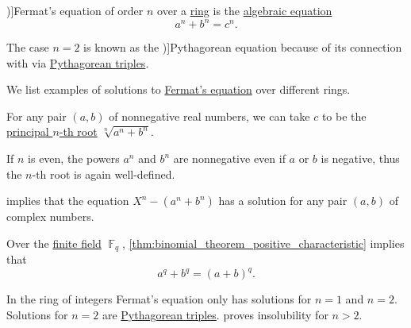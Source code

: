 \begin{definition}\label{def:fermats_equation}
  \term[ru=уравнение Ферма (\cite[314]{Бухштаб1966ТеорияЧисел})]{Fermat's equation} of order \( n \) over a \hyperref[def:ring]{ring} is the \hyperref[def:algebraic_equation]{algebraic equation}
  \begin{equation}\label{eq:def:fermats_equation}
    a^n + b^n = c^n.
  \end{equation}

  The case \( n = 2 \) is known as the \term[en=Pythagorean equation (\cite[\S 4.3.1]{Deza2012FigurateNumbers})]{Pythagorean equation} because of its connection with  via \hyperref[def:pythagorean_triple]{Pythagorean triples}.
\end{definition}

\begin{example}\label{ex:def:fermats_equation}
  We list examples of solutions to \hyperref[def:fermats_equation]{Fermat's equation} over different rings.
  \begin{thmenum}
     For any pair \( (a, b) \) of nonnegative real numbers, we can take \( c \) to be the \hyperref[def:principal_nonnegative_nth_root]{principal \( n \)-th root} \( \sqrt[n]{ a^n + b^n } \).

    If \( n \) is even, the powers \( a^n \) and \( b^n \) are nonnegative even if \( a \) or \( b \) is negative, thus the \( n \)-th root is again well-defined.

      implies that the equation \( X^n - (a^n + b^n) \) has a solution for any pair \( (a, b) \) of complex numbers.

     Over the \hyperref[def:finite_field]{finite field} \( \BbbF_q \), \cref{thm:binomial_theorem_positive_characteristic} implies that
    \begin{equation*}
      a^q + b^q = (a + b)^q.
    \end{equation*}

     In the ring of integers Fermat's equation only has solutions for \( n = 1 \) and \( n = 2 \). Solutions for \( n = 2 \) are \hyperref[def:pythagorean_triple]{Pythagorean triples}.  proves insolubility for \( n > 2 \).
  \end{thmenum}
\end{example}

